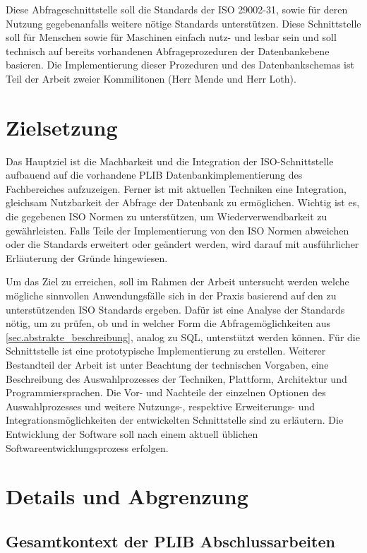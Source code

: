 Diese Abfrageschnittstelle soll die Standards der ISO 29002-31, sowie für deren Nutzung gegebenanfalls weitere nötige Standards unterstützen. Diese Schnittstelle soll für Menschen sowie für Maschinen einfach nutz- und lesbar sein und soll technisch auf bereits vorhandenen Abfrageprozeduren der Datenbankebene basieren. Die Implementierung dieser Prozeduren und des Datenbankschemas ist Teil der Arbeit zweier Kommilitonen (Herr Mende und Herr Loth).

\section{Zielsetzung}

Das Hauptziel ist die Machbarkeit und die Integration der ISO-Schnittstelle aufbauend auf die vorhandene PLIB Datenbankimplementierung des Fachbereiches aufzuzeigen. 
Ferner ist mit aktuellen Techniken eine Integration, gleichsam Nutzbarkeit der Abfrage der Datenbank zu ermöglichen. Wichtig ist es, die gegebenen ISO Normen zu unterstützen, um Wiederverwendbarkeit zu gewährleisten. Falls Teile der Implementierung von den ISO Normen abweichen oder die Standards erweitert oder geändert werden, wird darauf mit ausführlicher Erläuterung der Gründe hingewiesen. 

Um das Ziel zu erreichen, soll im Rahmen der Arbeit untersucht werden welche mögliche sinnvollen Anwendungsfälle sich in der Praxis basierend auf den zu unterstützenden ISO Standards ergeben. Dafür ist eine Analyse der Standards nötig, um zu prüfen, ob und in welcher Form die Abfragemöglichkeiten aus \autoref{sec.abstrakte_beschreibung}, analog zu SQL, unterstützt werden können. Für die Schnittstelle ist eine prototypische Implementierung zu erstellen. Weiterer Bestandteil der Arbeit ist unter Beachtung der technischen Vorgaben, eine Beschreibung des Auswahlprozesses der Techniken, Plattform, Architektur und Programmiersprachen. Die Vor- und Nachteile der einzelnen Optionen des Auswahlprozesses und weitere Nutzungs-, respektive Erweiterungs- und Integrationsmöglichkeiten der entwickelten Schnittstelle sind zu erläutern. 
Die Entwicklung der Software soll nach einem aktuell üblichen Softwareentwicklungsprozess erfolgen. 

\section{Details und Abgrenzung}

\subsection{Gesamtkontext der PLIB Abschlussarbeiten}

